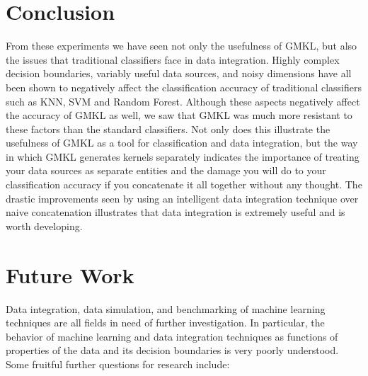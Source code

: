 \documentclass{article}
\begin{document}
\section*{Conclusion}
From these experiments we have seen not only the usefulness of GMKL, but also
the issues that traditional classifiers face in data integration. Highly
complex decision boundaries, variably useful data sources, and noisy dimensions have all been shown to negatively affect the
classification accuracy of traditional classifiers such as KNN, SVM and Random
Forest. Although these aspects negatively affect the accuracy of GMKL as well, we saw that GMKL was much more resistant to these factors than the standard classifiers. Not only does this illustrate the usefulness of GMKL as a tool for
classification and data integration, but the way in which GMKL generates
kernels separately indicates the importance of treating your data sources as
separate entities and the damage you will do to your classification accuracy if
you concatenate it all together without any thought. The drastic improvements
seen by using an intelligent data integration technique over naive
concatenation illustrates that data integration is extremely useful and is
worth developing.


\section*{Future Work}
Data integration, data simulation, and benchmarking of machine learning
techniques are all fields in need of further investigation. In particular, the
behavior of machine learning and data integration techniques as functions of
properties of the data and its decision boundaries is very poorly understood.
Some fruitful further questions for research include:
\end{document}
